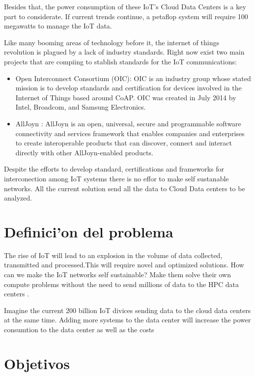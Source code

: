 Besides that, the power consumption of these  IoT’s Cloud Data Centers is a key
part to considerate. If current trends continue, a petaflop system will require 
100 megawatts to manage the IoT data. 

Like many booming areas of technology before it, the internet of things
revolution is plagued by a lack of industry standards. Right now exist two main 
projects that are compiing to stablish standards for the IoT communications: 

\begin{itemize}
\item Open Interconnect Consortium (OIC): OIC is an industry group whose stated 
mission is to develop standards and certification for devices involved in the 
Internet of Things based around CoAP. OIC was created in July 2014 by Intel, 
Broadcom, and Samsung Electronics.
\item AllJoyn : AllJoyn is an open, universal, secure and programmable software 
connectivity and services framework that enables companies and enterprises to 
create interoperable products that can discover, connect and interact directly 
with other AllJoyn-enabled products.
\end{itemize}

Despite the efforts to develop standard, certifications and frameworks for 
interconection among IoT systems there is no effor to make self sustanable 
networks. All the current solution send all the data to Cloud Data centers to be 
analyzed. 

\section{Definici'on del problema}
\noindent

The rise of IoT will lead to an explosion in the volume of data collected, 
transmitted and processed.This will require novel and optimized solutions. 
How can we make the IoT networks self sustainable? Make them solve their own compute problems 
without the need to send millions of data to the HPC data centers . 

Imagine the current 200 billion IoT divices sending data to the cloud data 
centers at the same time. Adding more systems to the data center will increase 
the power consumtion to the data center as well as the costs


\section{Objetivos}
\noindent

